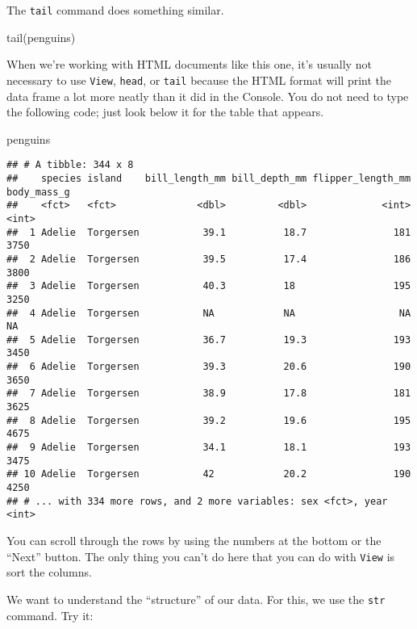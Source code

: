 \documentclass[
]{book}
\newenvironment{Shaded}{\begin{snugshade}}{\end{snugshade}}
\newcommand{\FunctionTok}[1]{\textcolor[rgb]{0.00,0.00,0.00}{#1}}
\newcommand{\NormalTok}[1]{#1}
\begin{document}
The \texttt{tail} command does something similar.

\begin{Shaded}
\begin{Highlighting}[]
\FunctionTok{tail}\NormalTok{(penguins)}
\end{Highlighting}
\end{Shaded}

When we're working with HTML documents like this one, it's usually not necessary to use \texttt{View}, \texttt{head}, or \texttt{tail} because the HTML format will print the data frame a lot more neatly than it did in the Console. You do not need to type the following code; just look below it for the table that appears.

\begin{Shaded}
\begin{Highlighting}[]
\NormalTok{penguins}
\end{Highlighting}
\end{Shaded}

\begin{verbatim}
## # A tibble: 344 x 8
##    species island    bill_length_mm bill_depth_mm flipper_length_mm body_mass_g
##    <fct>   <fct>              <dbl>         <dbl>             <int>       <int>
##  1 Adelie  Torgersen           39.1          18.7               181        3750
##  2 Adelie  Torgersen           39.5          17.4               186        3800
##  3 Adelie  Torgersen           40.3          18                 195        3250
##  4 Adelie  Torgersen           NA            NA                  NA          NA
##  5 Adelie  Torgersen           36.7          19.3               193        3450
##  6 Adelie  Torgersen           39.3          20.6               190        3650
##  7 Adelie  Torgersen           38.9          17.8               181        3625
##  8 Adelie  Torgersen           39.2          19.6               195        4675
##  9 Adelie  Torgersen           34.1          18.1               193        3475
## 10 Adelie  Torgersen           42            20.2               190        4250
## # ... with 334 more rows, and 2 more variables: sex <fct>, year <int>
\end{verbatim}

You can scroll through the rows by using the numbers at the bottom or the ``Next'' button. The only thing you can't do here that you can do with \texttt{View} is sort the columns.

We want to understand the ``structure'' of our data. For this, we use the \texttt{str} command. Try it:
\end{document}
